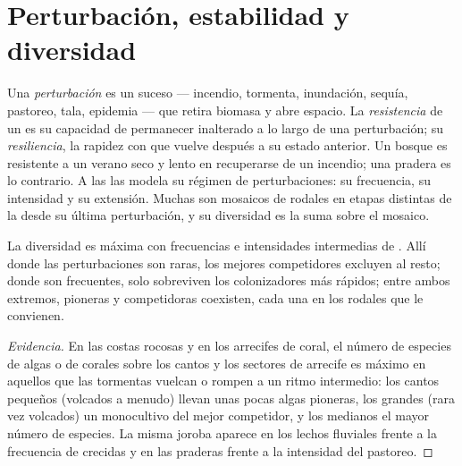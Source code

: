 \section{Perturbación, estabilidad y diversidad}

\begin{definition}\label{def:b1:ecosystem-dynamics:disturbance}
Una \emph{perturbación} es un suceso --- incendio, tormenta, inundación,
sequía, pastoreo, tala, epidemia --- que retira biomasa y abre espacio. La
\emph{resistencia} de un  es su capacidad de permanecer inalterado
a lo largo de una perturbación; su \emph{resiliencia}, la rapidez con que
vuelve después a su estado anterior. Un bosque es resistente a un verano
seco y lento en recuperarse de un incendio; una pradera es lo contrario. A
las  las modela su régimen de perturbaciones: su frecuencia, su
intensidad y su extensión. Muchas  son mosaicos de rodales en
etapas distintas de la  desde su última perturbación, y su
diversidad es la suma sobre el mosaico.
\end{definition}

\begin{proposition}\label{prop:b1:ecosystem-dynamics:idh}
La diversidad es máxima con frecuencias e intensidades intermedias de
. Allí donde las perturbaciones son raras, los mejores
competidores excluyen al resto; donde son frecuentes, solo sobreviven los
colonizadores más rápidos; entre ambos extremos, pioneras y competidoras
coexisten, cada una en los rodales que le convienen.
\end{proposition}
\begin{proof}[Evidencia]
En las costas rocosas y en los arrecifes de coral, el número de especies de
algas o de corales sobre los cantos y los sectores de arrecife es máximo en
aquellos que las tormentas vuelcan o rompen a un ritmo intermedio: los
cantos pequeños (volcados a menudo) llevan unas pocas algas pioneras, los
grandes (rara vez volcados) un monocultivo del mejor competidor, y los
medianos el mayor número de especies. La misma joroba aparece en los lechos
fluviales frente a la frecuencia de crecidas y en las praderas frente a la
intensidad del pastoreo.
\end{proof}

